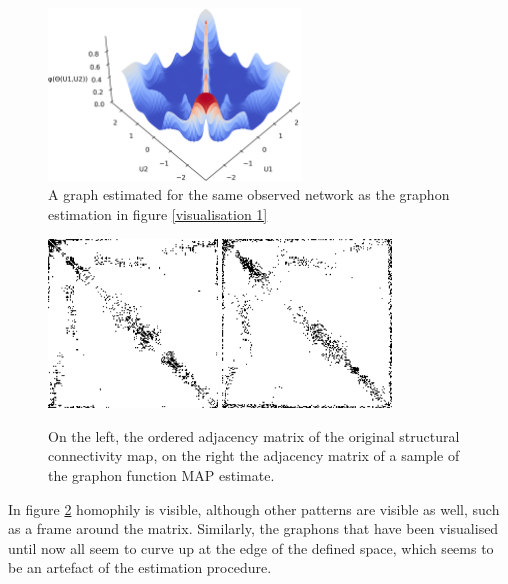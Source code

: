 \documentclass[11pt]{report} %
\begin{document}
\begin{figure}[H]
    \center
    \includegraphics[width= 0.6\textwidth]{graphon_100307_2}%
    \hfill
    \caption{A graph estimated for the same observed network as the graphon estimation in figure \ref{visualisation 1}}
    \label{alternativegraph}
\end{figure}

\begin{figure}[H]
    \center
    \includegraphics[width= 0.4\textwidth]{sorted_subject_matrix}%
    \hfill
    \includegraphics[width= 0.4\textwidth]{sorted_sample}%
    \caption{On the left, the ordered adjacency matrix of the original structural connectivity map, on the right the adjacency matrix of a sample of the graphon function MAP estimate.}
    \label{sortedadjacencymatrix}
\end{figure}

In figure \ref{sortedadjacencymatrix} homophily is visible, although other patterns are visible as well, such as a frame around the matrix. Similarly, the graphons that have been visualised until now all seem to curve up at the edge of the defined space, which seems to be an artefact of the estimation procedure.
\end{document}
